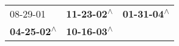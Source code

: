 \begin{supertabular}{lll}
                  08-29-01\textsuperscript{} &  \textbf{11-23-02\textsuperscript{$\wedge$}} &  \textbf{01-31-04\textsuperscript{$\wedge$}} \\
 \textbf{04-25-02\textsuperscript{$\wedge$}} &  \textbf{10-16-03\textsuperscript{$\wedge$}} &                                              \\
\end{supertabular}
